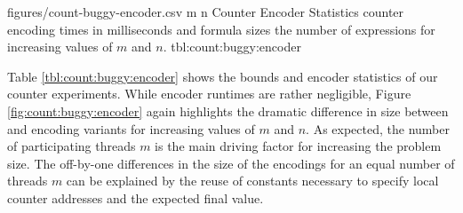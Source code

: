 

\newcommand{\CountRowHeader}[1]{\StrSubstitute{#1}{ }{\hfill}}


\bigbreak

\EncoderStatsTable
  {figures/count-buggy-encoder.csv}
  {m n}
  {\CountRowHeader}
  { Counter Encoder Statistics}
  { counter encoding times in milliseconds and formula sizes  the number of expressions for increasing values of $m$ and $n$.}
  {tbl:count:buggy:encoder}

Table \ref{tbl:count:buggy:encoder} shows the bounds and encoder statistics of our  counter experiments.
While encoder runtimes are rather negligible, Figure \ref{fig:count:buggy:encoder} again highlights the dramatic difference in size between {\BTOR} and {\SMTLIB} encoding variants for increasing values of $m$ and $n$. %
As expected, the number of participating threads $m$ is the main driving factor for
increasing the problem size.
The off-by-one differences in the size of the {\BTOR} encodings for an equal number of threads $m$ can be explained by the reuse of constants necessary to specify local counter addresses and the expected final value.

